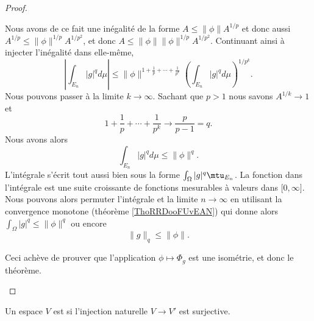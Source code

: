 \begin{proof}
\begin{subproof}
            Nous avons de ce fait une inégalité de la forme \( A\leq \| \phi \|A^{1/p}\) et donc aussi \( A^{1/p}\leq \| \phi \|^{1/p}A^{1/p^2}\), et donc \( A\leq \| \phi \|\| \phi \|^{1/p}A^{1/p^2}\). Continuant ainsi à injecter l'inégalité dans elle-même,
            \begin{equation}
                \left| \int_{E_n}| g |^qd\mu \right| \leq\| \phi \|^{1+\frac{1}{ p }+\cdots+\frac{1}{ p^k }}\left( \int_{E_n}| g |^qd\mu \right)^{1/p^k}.
            \end{equation}
            Nous pouvons passer à la limite \( k\to \infty\). Sachant que \( p>1\) nous savons \( A^{1/k}\to 1\) et
            \begin{equation}
                1+\frac{1}{ p }+\cdots+\frac{1}{ p^k }\to\frac{ p }{ p-1 }=q.
            \end{equation}
            Nous avons alors
            \begin{equation}
                \int_{E_n}| g |^qd\mu\leq \| \phi \|^q.
            \end{equation}
            L'intégrale s'écrit tout aussi bien sous la forme \( \int_{\Omega}| g  |^q\mtu_{E_n}\). La fonction dans l'intégrale est une suite croissante de fonctions mesurables à valeurs dans \( \mathopen[ 0 , \infty \mathclose]\). Nous pouvons alors permuter l'intégrale et la limite \( n\to \infty\) en utilisant la convergence monotone (théorème \ref{ThoRRDooFUvEAN}) qui donne alors \( \int_{\Omega}| g |^q\leq \| \phi \|^q\) ou encore
            \begin{equation}
                \| g \|_q\leq \| \phi \|.
            \end{equation}

            Ceci achève de prouver que l'application \( \phi\mapsto \Phi_g\) est une isométrie, et donc le théorème.

    \end{subproof}
\end{proof}

\begin{definition}
    Un espace \( V\) est  si l'injection naturelle \( V\to V'\) est surjective.
\end{definition}

